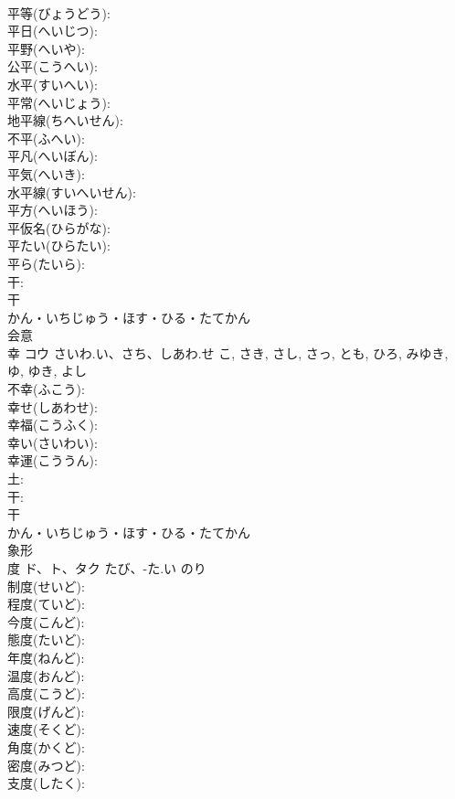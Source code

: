 \documentclass[8pt]{extreport}
\begin{document}
\begin{CJK}{UTF8}{min}
\\	平等(びょうどう): 
\\	平日(へいじつ): 
\\	平野(へいや): 
\\	公平(こうへい): 
\\	水平(すいへい): 
\\	平常(へいじょう): 
\\	地平線(ちへいせん): 
\\	不平(ふへい): 
\\	平凡(へいぼん): 
\\	平気(へいき): 
\\	水平線(すいへいせん): 
\\	平方(へいほう): 
\\	平仮名(ひらがな): 
\\	平たい(ひらたい): 
\\	平ら(たいら): 
\\	干: 
\\	干	
\\	かん・いちじゅう・ほす・ひる・たてかん	
\\	会意 
\\	幸	コウ	さいわ.い、さち、しあわ.せ	こ, さき, さし, さっ, とも, ひろ, みゆき, ゆ, ゆき, よし	
\\	不幸(ふこう): 
\\	幸せ(しあわせ): 
\\	幸福(こうふく): 
\\	幸い(さいわい): 
\\	幸運(こううん): 
\\	土: 
\\	干: 
\\	干	
\\	かん・いちじゅう・ほす・ひる・たてかん	
\\	象形 
\\	度	ド、ト、タク	たび、-た.い	のり	
\\	制度(せいど): 
\\	程度(ていど): 
\\	今度(こんど): 
\\	態度(たいど): 
\\	年度(ねんど): 
\\	温度(おんど): 
\\	高度(こうど): 
\\	限度(げんど): 
\\	速度(そくど): 
\\	角度(かくど): 
\\	密度(みつど): 
\\	支度(したく): 

\end{CJK}
\end{document}
